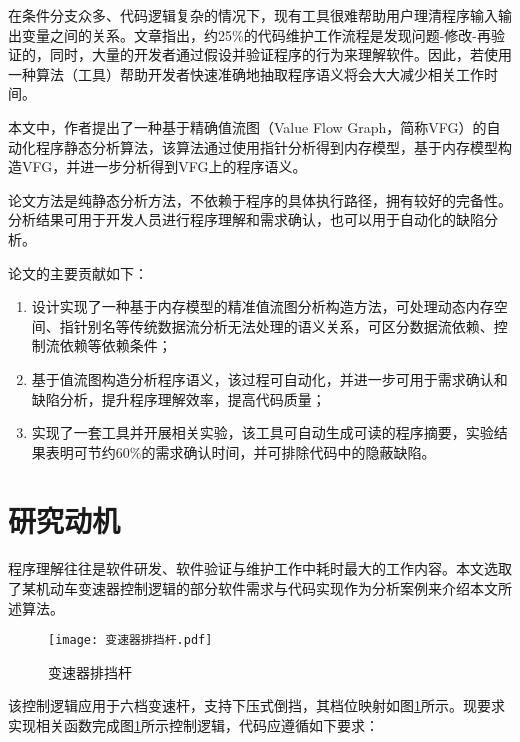 在条件分支众多、代码逻辑复杂的情况下，现有工具很难帮助用户理清程序输入输出变量之间的关系。文章指出，约25\%的代码维护工作流程是发现问题-修改-再验证的，同时，大量的开发者通过假设并验证程序的行为来理解软件\cite{maalej2014comprehension}。因此，若使用一种算法（工具）帮助开发者快速准确地抽取程序语义将会大大减少相关工作时间。

本文中，作者提出了一种基于精确值流图（Value Flow Graph，简称VFG）的自动化程序静态分析算法，该算法通过使用指针分析得到内存模型，基于内存模型构造VFG，并进一步分析得到VFG上的程序语义。

论文方法是纯静态分析方法，不依赖于程序的具体执行路径，拥有较好的完备性。分析结果可用于开发人员进行程序理解和需求确认，也可以用于自动化的缺陷分析。

论文的主要贡献如下：
\begin{enumerate}
	\item 设计实现了一种基于内存模型的精准值流图分析构造方法，可处理动态内存空间、指针别名等传统数据流分析无法处理的语义关系，可区分数据流依赖、控制流依赖等依赖条件；
	\item 基于值流图构造分析程序语义，该过程可自动化，并进一步可用于需求确认和缺陷分析，提升程序理解效率，提高代码质量；
	\item 实现了一套工具并开展相关实验，该工具可自动生成可读的程序摘要，实验结果表明可节约60\%的需求确认时间，并可排除代码中的隐蔽缺陷。
\end{enumerate}

\section{研究动机}

程序理解往往是软件研发、软件验证与维护工作中耗时最大的工作内容。本文选取了某机动车变速器控制逻辑的部分软件需求与代码实现作为分析案例来介绍本文所述算法。

\begin{figure}[H]
	\centering
	\texttt{[image: 变速器排挡杆.pdf]}
	\caption{变速器排挡杆}
	\label{fig:gearLever}
\end{figure}

该控制逻辑应用于六档变速杆，支持下压式倒挡，其档位映射如图\ref{fig:gearLever}所示。现要求实现相关函数完成图\ref{fig:gearLever}所示控制逻辑，代码应遵循如下要求：

